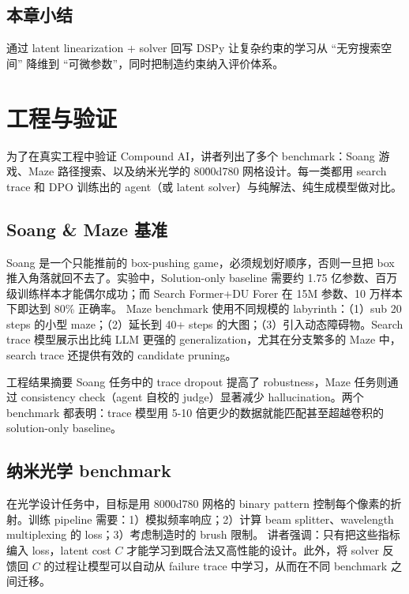 \documentclass[a4paper]{article}
\begin{document}
\subsection{本章小结}

通过 latent linearization + solver 回写 DSPy 让复杂约束的学习从 ``无穷搜索空间'' 降维到 ``可微参数''，同时把制造约束纳入评价体系。

\section{工程与验证}

为了在真实工程中验证 Compound AI，讲者列出了多个 benchmark：Soang 游戏、Maze 路径搜索、以及纳米光学的 80\u00d780 网格设计。每一类都用 search trace 和 DPO 训练出的 agent（或 latent solver）与纯解法、纯生成模型做对比。

\subsection{Soang \& Maze 基准}

Soang 是一个只能推前的 box-pushing game，必须规划好顺序，否则一旦把 box 推入角落就回不去了。实验中，Solution-only baseline 需要约 1.75 亿参数、百万级训练样本才能偶尔成功；而 Search Former+DU Forer 在 15M 参数、10 万样本下即达到 80\% 正确率。
Maze benchmark 使用不同规模的 labyrinth：（1）sub 20 steps 的小型 maze；（2）延长到 40+ steps 的大图；（3）引入动态障碍物。Search trace 模型展示出比纯 LLM 更强的 generalization，尤其在分支繁多的 Maze 中，search trace 还提供有效的 candidate pruning。
\begin{knowledgebox}{工程结果摘要}
Soang 任务中的 trace dropout 提高了 robustness，Maze 任务则通过 consistency check（agent 自校的 judge）显著减少 hallucination。两个 benchmark 都表明：trace 模型用 5-10 倍更少的数据就能匹配甚至超越卷积的 solution-only baseline。
\end{knowledgebox}

\subsection{纳米光学 benchmark}

在光学设计任务中，目标是用 80\u00d780 网格的 binary pattern 控制每个像素的折射。训练 pipeline 需要：1）模拟频率响应；2）计算 beam splitter、wavelength multiplexing 的 loss；3）考虑制造时的 brush 限制。
讲者强调：只有把这些指标编入 loss，latent cost \(C\) 才能学习到既合法又高性能的设计。此外，将 solver 反馈回 \(C\) 的过程让模型可以自动从 failure trace 中学习，从而在不同 benchmark 之间迁移。
\end{document}
